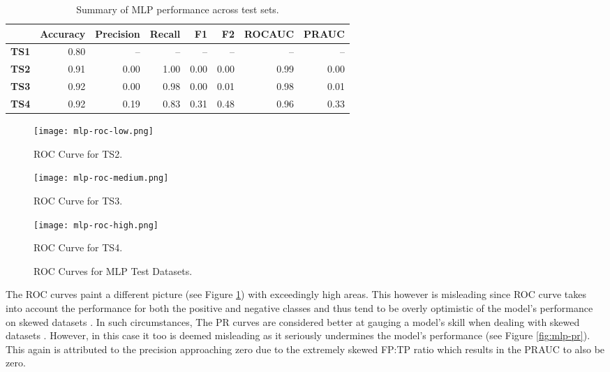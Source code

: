 \begin{table}[htb]
  \centering
  \caption{Summary of MLP performance across test sets.}
    \begin{tabular}{rrrrrrrr}
      \hline
      & Accuracy & Precision & Recall & F1 & F2 & ROCAUC & PRAUC \\
      \hline
      \textbf{TS1} & 0.80 & -- & -- & -- & -- & -- & -- \\
      \textbf{TS2} & 0.91 & 0.00 & 1.00 & 0.00 & 0.00 & 0.99 & 0.00 \\
      \textbf{TS3} & 0.92 & 0.00 & 0.98 & 0.00 & 0.01 & 0.98 & 0.01 \\
      \textbf{TS4} & 0.92 & 0.19 & 0.83 & 0.31 & 0.48 & 0.96 & 0.33 \\
      \hline
    \end{tabular}
    \label{tab:mlp-results}
\end{table}

\begin{figure}[htb]
  \centering
  \begin{minipage}{0.32\textwidth}
    \centering
    \texttt{[image: mlp-roc-low.png]}
    \caption{ROC Curve for TS2.}
  \end{minipage}
  \begin{minipage}{0.32\textwidth}
    \centering
    \texttt{[image: mlp-roc-medium.png]}
    \caption{ROC Curve for TS3.}
  \end{minipage}
  \begin{minipage}{0.32\textwidth}
    \centering
    \texttt{[image: mlp-roc-high.png]}
    \caption{ROC Curve for TS4.}
  \end{minipage}
  \caption{ROC Curves for MLP Test Datasets.}
  \label{fig:mlp-roc}
\end{figure}

The ROC curves paint a different picture (see Figure
\ref{fig:mlp-roc}) with exceedingly high areas. This however is
misleading since ROC curve takes into account the performance for both
the positive and negative classes and thus tend to be overly
optimistic of the model's performance on skewed datasets
\cite{branco2015survey,fernandez2018learning}. In such circumstances,
The PR curves are considered better at gauging a model's skill when
dealing with skewed datasets \cite{branco2015survey}. However, in this
case it too is deemed misleading as it seriously undermines the
model's performance (see Figure \ref{fig:mlp-pr}). This again is
attributed to the precision approaching zero due to the extremely
skewed FP:TP ratio which results in the PRAUC to also be zero.

